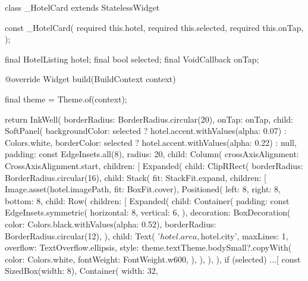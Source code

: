 \documentclass[11pt,a4paper]{article}
\begin{document}
\begin{codeblock}
class _HotelCard extends StatelessWidget {
  const _HotelCard({
    required this.hotel,
    required this.selected,
    required this.onTap,
  });

  final HotelListing hotel;
  final bool selected;
  final VoidCallback onTap;

  @override
  Widget build(BuildContext context) {
    final theme = Theme.of(context);

    return InkWell(
      borderRadius: BorderRadius.circular(20),
      onTap: onTap,
      child: SoftPanel(
        backgroundColor:
            selected ? hotel.accent.withValues(alpha: 0.07) : Colors.white,
        borderColor: selected ? hotel.accent.withValues(alpha: 0.22) : null,
        padding: const EdgeInsets.all(8),
        radius: 20,
        child: Column(
          crossAxisAlignment: CrossAxisAlignment.start,
          children: [
            Expanded(
              child: ClipRRect(
                borderRadius: BorderRadius.circular(16),
                child: Stack(
                  fit: StackFit.expand,
                  children: [
                    Image.asset(hotel.imagePath, fit: BoxFit.cover),
                    Positioned(
                      left: 8,
                      right: 8,
                      bottom: 8,
                      child: Row(
                        children: [
                          Expanded(
                            child: Container(
                              padding: const EdgeInsets.symmetric(
                                horizontal: 8,
                                vertical: 6,
                              ),
                              decoration: BoxDecoration(
                                color: Colors.black.withValues(alpha: 0.52),
                                borderRadius: BorderRadius.circular(12),
                              ),
                              child: Text(
                                '${hotel.area}, ${hotel.city}',
                                maxLines: 1,
                                overflow: TextOverflow.ellipsis,
                                style: theme.textTheme.bodySmall?.copyWith(
                                  color: Colors.white,
                                  fontWeight: FontWeight.w600,
                                ),
                              ),
                            ),
                          ),
                          if (selected) ...[
                            const SizedBox(width: 8),
                            Container(
                              width: 32,
}}
\end{codeblock}
\end{document}
